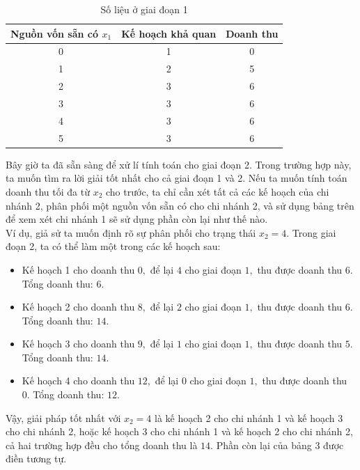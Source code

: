 \documentclass[12pt,a4paper]{article}
\begin{document}
\begin{table}[H]
\begin{center}
\label{bang2}
\begin{tabular}{|c|c|c|}
\hline 
Nguồn vốn sẵn có \(x_1\) & Kế hoạch khả quan & Doanh thu \\ 
\hline 
0 & 1 & 0 \\ 
\hline 
1 & 2 & 5 \\ 
\hline 
2 & 3 & 6 \\ 
\hline 
3 & 3 & 6 \\ 
\hline 
4 & 3 & 6 \\ 
\hline 
5 & 3 & 6 \\ 
\hline 
\end{tabular} 
\caption{Số liệu ở giai đoạn 1}
\end{center}
\end{table}
Bây giờ ta đã sẵn sàng để xử lí tính toán cho giai đoạn 2. Trong trường hợp này, ta muốn tìm ra lời giải tốt nhất cho cả giai đoạn 1 và 2. Nếu ta muốn tính toán doanh thu tối đa từ \(x_2\) cho trước, ta chỉ cần xét tất cả các kế hoạch của chi nhánh 2, phân phối một nguồn vốn sẵn có cho chi nhánh 2, và sử dụng bảng trên để xem xét chi nhánh 1 sẽ sử dụng phần còn lại như thế nào.\\
Ví dụ, giả sử ta muốn định rõ sự phân phối cho trạng thái \(x_2 = 4.\) Trong giai đoạn 2, ta có thể làm một trong các kế hoạch sau:
\begin{itemize}
\item Kế hoạch 1 cho doanh thu \(0,\) để lại \(4\) cho giai đoạn \(1,\) thu được doanh thu \(6.\) Tổng doanh thu: \(6.\)
\item Kế hoạch 2 cho doanh thu \(8,\) để lại \(2\) cho giai đoạn \(1,\) thu được doanh thu \(6.\) Tổng doanh thu: \(14.\)
\item Kế hoạch 3 cho doanh thu \(9,\) để lại \(1\) cho giai đoạn \(1,\) thu được doanh thu \(5.\) Tổng doanh thu: \(14.\)
\item Kế hoạch 4 cho doanh thu \(12,\) để lại \(0\) cho giai đoạn \(1,\) thu được doanh thu \(0.\) Tổng doanh thu: \(12.\)
\end{itemize}
Vậy, giải pháp tốt nhất với \(x_2 = 4\) là kế hoạch 2 cho chi nhánh 1 và kế hoạch 3 cho chi nhánh 2, hoặc kế hoạch 3 cho chi nhánh 1 và kế hoạch 2 cho chi nhánh 2, cả hai trường hợp đều cho tổng doanh thu là \(14.\) Phần còn lại của bảng 3 được điền tương tự.\\
\end{document}
